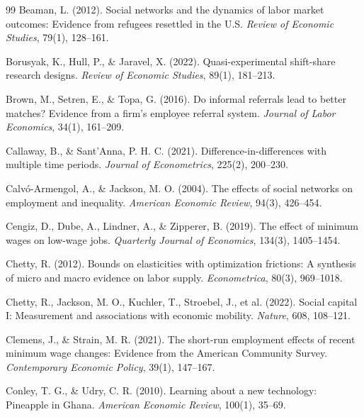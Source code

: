 \documentclass[12pt]{article}
\begin{document}
\begin{thebibliography}{99}
Beaman, L. (2012).
Social networks and the dynamics of labor market outcomes: Evidence from refugees resettled in the U.S.
\textit{Review of Economic Studies}, 79(1), 128--161.

Borusyak, K., Hull, P., \& Jaravel, X. (2022).
Quasi-experimental shift-share research designs.
\textit{Review of Economic Studies}, 89(1), 181--213.

Brown, M., Setren, E., \& Topa, G. (2016).
Do informal referrals lead to better matches? Evidence from a firm's employee referral system.
\textit{Journal of Labor Economics}, 34(1), 161--209.

Callaway, B., \& Sant'Anna, P. H. C. (2021).
Difference-in-differences with multiple time periods.
\textit{Journal of Econometrics}, 225(2), 200--230.

Calv{\'o}-Armengol, A., \& Jackson, M. O. (2004).
The effects of social networks on employment and inequality.
\textit{American Economic Review}, 94(3), 426--454.

Cengiz, D., Dube, A., Lindner, A., \& Zipperer, B. (2019).
The effect of minimum wages on low-wage jobs.
\textit{Quarterly Journal of Economics}, 134(3), 1405--1454.

Chetty, R. (2012).
Bounds on elasticities with optimization frictions: A synthesis of micro and macro evidence on labor supply.
\textit{Econometrica}, 80(3), 969--1018.

Chetty, R., Jackson, M. O., Kuchler, T., Stroebel, J., et al. (2022).
Social capital I: Measurement and associations with economic mobility.
\textit{Nature}, 608, 108--121.

Clemens, J., \& Strain, M. R. (2021).
The short-run employment effects of recent minimum wage changes: Evidence from the American Community Survey.
\textit{Contemporary Economic Policy}, 39(1), 147--167.

Conley, T. G., \& Udry, C. R. (2010).
Learning about a new technology: Pineapple in Ghana.
\textit{American Economic Review}, 100(1), 35--69.


\end{thebibliography}
\end{document}
